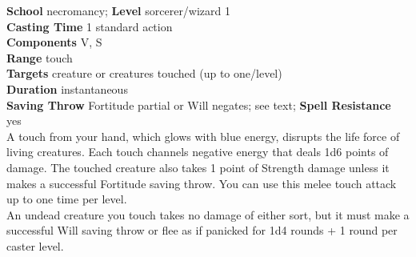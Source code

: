 \textbf{School} necromancy; \textbf{Level} sorcerer/wizard 1\\
\textbf{Casting Time} 1 standard action\\
\textbf{Components} V, S\\
\textbf{Range} touch\\
\textbf{Targets} creature or creatures touched (up to one/level)\\
\textbf{Duration} instantaneous\\
\textbf{Saving Throw} Fortitude partial or Will negates; see text; \textbf{Spell Resistance} yes\\
A touch from your hand, which glows with blue energy, disrupts the life force of living creatures. Each touch channels negative energy that deals 1d6 points of damage. The touched creature also takes 1 point of Strength damage unless it makes a successful Fortitude saving throw. You can use this melee touch attack up to one time per level.\\
An undead creature you touch takes no damage of either sort, but it must make a successful Will saving throw or flee as if panicked for 1d4 rounds + 1 round per caster level.\\
